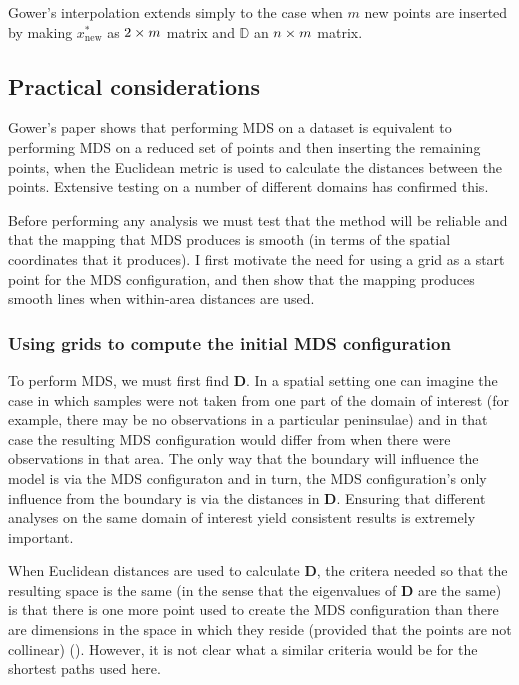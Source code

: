 Gower's interpolation extends simply to the case when $m$ new points are inserted by making $x^*_{\text{new}}$ as $2 \times m$ matrix and $\mathbb{D}$ an $n \times m$ matrix.


\subsection{Practical considerations}

Gower's paper shows that performing MDS on a dataset is equivalent to performing MDS on a reduced set of points and then inserting the remaining points, when the Euclidean metric is used to calculate the distances between the points. Extensive testing on a number of different domains has confirmed this.

Before performing any analysis we must test that the method will be reliable and that the mapping that MDS produces is smooth (in terms of the spatial coordinates that it produces). I first motivate the need for using a grid as a start point for the MDS configuration, and then show that the mapping produces smooth lines when within-area distances are used.

\subsubsection{Using grids to compute the initial MDS configuration}
\label{grids}

To perform MDS, we must first find $\mathbf{D}$. In a spatial setting one can imagine the case in which samples were not taken from one part of the domain of interest (for example, there may be no observations in a particular peninsulae) and in that case the resulting MDS configuration would differ from when there were observations in that area. The only way that the boundary will influence the model is via the MDS configuraton and in turn, the MDS configuration's only influence from the boundary is via the distances in $\mathbf{D}$. Ensuring that different analyses on the same domain of interest yield consistent results is extremely important. 

When Euclidean distances are used to calculate $\mathbf{D}$, the critera needed so that the resulting space is the same (in the sense that the eigenvalues of $\mathbf{D}$ are the same) is that there is one more point used to create the MDS configuration than there are dimensions in the space in which they reside (provided that the points are not collinear) (\cite{landmark}). However, it is not clear what a similar criteria would be for the shortest paths used here. 

